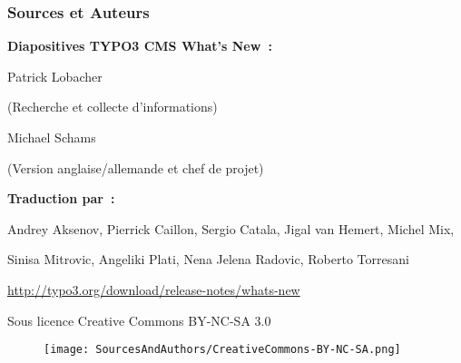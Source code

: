 \begin{frame}[fragile]
	\frametitle{Sources et Auteurs}

	\vspace{-0.6cm}

	\centerline{\textbf{Diapositives TYPO3 CMS What's New~:}}

	\begin{center}
		\smaller
			\centerline{Patrick Lobacher}
			\centerline{(Recherche et collecte d'informations)}
			\vspace{0.1cm}
			\centerline{Michael Schams}
			\centerline{(Version anglaise/allemande et chef de projet)}
		\normalsize
	\end{center}
	\vspace{-0.6cm}
	\begin{center}
		\smaller
			\centerline{\textbf{Traduction par~:}}
			\centerline{Andrey Aksenov, Pierrick Caillon, Sergio Catala, Jigal van Hemert, Michel Mix,}
			\centerline{Sinisa Mitrovic, Angeliki Plati, Nena Jelena Radovic, Roberto Torresani}
		\normalsize
	\end{center}
	\vspace{-0.6cm}
	\smaller\begin{center}\url{http://typo3.org/download/release-notes/whats-new}\end{center}\normalsize

	\smaller\begin{center}Sous licence Creative Commons BY-NC-SA 3.0\end{center}\normalsize
	\begin{figure}\vspace*{-0.3cm}
		\texttt{[image: SourcesAndAuthors/CreativeCommons-BY-NC-SA.png]}
	\end{figure}

\end{frame}

